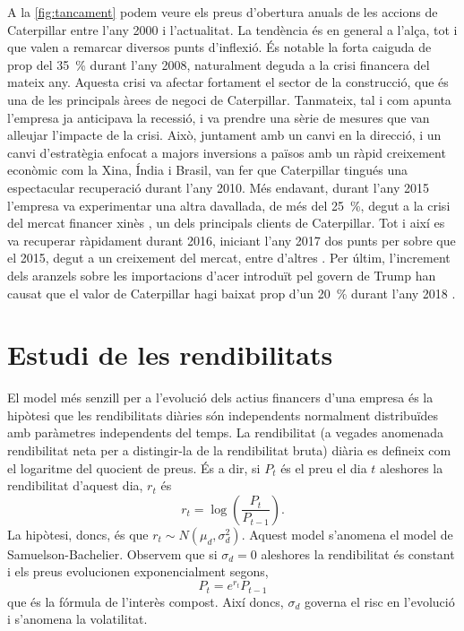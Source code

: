 \documentclass{article}
\numberwithin{table}{section}
\numberwithin{figure}{section}
\numberwithin{equation}{section}
\begin{document}
A la \cref{fig:tancament} podem veure els preus d'obertura anuals de les accions de Caterpillar entre l'any 2000 i l'actualitat. La tendència és en general a l'alça, tot i que valen a remarcar diversos punts d'inflexió. És notable la forta caiguda de prop del \SI{35}{\percent} durant l'any 2008, naturalment deguda a la crisi financera del mateix any. Aquesta crisi va afectar fortament el sector de la construcció, que és una de les principals àrees de negoci de Caterpillar. Tanmateix, tal i com apunta \cite{recupera} l'empresa ja anticipava la recessió, i va prendre una sèrie de mesures que van alleujar l'impacte de la crisi. Això, juntament amb un canvi en la direcció, i un canvi d'estratègia enfocat a majors inversions a països amb un ràpid creixement econòmic com la Xina, Índia i Brasil, van fer que Caterpillar tingués una espectacular recuperació durant l'any 2010. Més endavant, durant l'any 2015 l'empresa va experimentar una altra davallada, de més del \SI{25}{\percent}, degut a la crisi del mercat financer xinès \cite{xina}, un dels principals clients de Caterpillar. Tot i així es va recuperar ràpidament durant 2016, iniciant l'any 2017 dos punts per sobre que el 2015, degut a un creixement del mercat, entre d'altres \cite{crush}. Per últim, l'increment dels aranzels sobre les importacions d'acer introduït pel govern de Trump han causat que el valor de Caterpillar hagi baixat prop d'un \SI{20}{\percent} durant l'any 2018 \cite{trump}.


\section{Estudi de les rendibilitats}
El model més senzill per a l'evolució dels actius financers d'una empresa és la hipòtesi que les rendibilitats diàries són independents normalment distribuïdes amb paràmetres independents del temps. La rendibilitat (a vegades anomenada rendibilitat neta per a distingir-la de la rendibilitat bruta) diària es defineix com el logaritme del quocient de preus. És a dir, si \( P_t \) és el preu el dia \( t \) aleshores la rendibilitat d'aquest dia, \( r_t \) és
\begin{equation}
	r_t = \log{\left(\frac{P_t}{P_{t-1}}\right)}.
	\label{eq:rend}
\end{equation}
La hipòtesi, doncs, és que \( r_t \sim N(\mu_d, \sigma_d^2) \). Aquest model s'anomena el model de Samuelson-Bachelier. Observem que si \( \sigma_d = 0 \) aleshores la rendibilitat és constant i els preus evolucionen exponencialment segons,
\begin{equation*}
	P_t = e^{r_t}P_{t-1}
\end{equation*}
que és la fórmula de l'interès compost. Així doncs, \( \sigma_d \) governa el risc en l'evolució i s'anomena la volatilitat.
\end{document}
